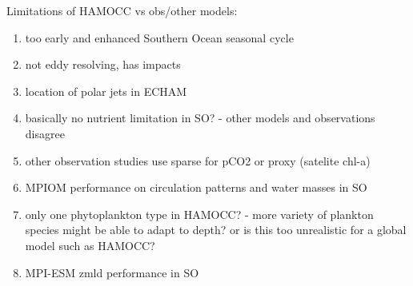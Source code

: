 Limitations of HAMOCC vs obs/other models:
\begin{enumerate}
\item too early and enhanced Southern Ocean seasonal cycle \citep{Nevison2016}
\item not eddy resolving, has impacts \citep{somestudy}
\item location of polar jets in ECHAM %
\item basically no nutrient limitation in SO? - other models and observations disagree
\item other observation studies use sparse for pCO2 or proxy (satelite chl-a)
\item MPIOM performance on circulation patterns and water masses in SO %
\item only one phytoplankton type in HAMOCC? - more variety of plankton species might be able to adapt to depth? or is this too unrealistic for a global model such as HAMOCC?
\item MPI-ESM zmld performance in SO \citep{Sallee2013}
\end{enumerate} 